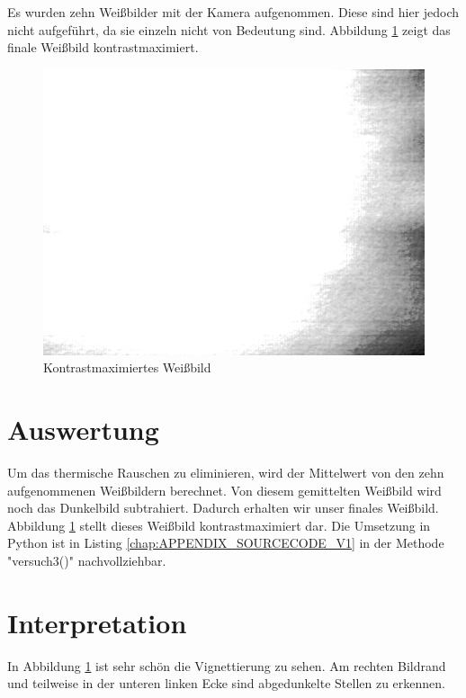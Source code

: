 \documentclass[12pt,oneside,a4paper]{report}
\begin{document}
Es wurden zehn Weißbilder mit der Kamera aufgenommen. Diese sind hier jedoch nicht aufgeführt, da sie einzeln nicht von Bedeutung sind.
Abbildung \ref{fig:WEISSBILD} zeigt das finale Weißbild kontrastmaximiert.
 
\begin{figure}
\centering\small
\includegraphics[scale=0.6]{src/WeissbildContrastMax.png}
\caption{Kontrastmaximiertes Weißbild}
\label{fig:WEISSBILD}
\end{figure}

\section{Auswertung}
\label{chap:VERSUCH_3_AUSWERTUNG}

Um das thermische Rauschen zu eliminieren, wird der Mittelwert von den zehn aufgenommenen Weißbildern berechnet. Von diesem gemittelten Weißbild wird noch das Dunkelbild subtrahiert.
Dadurch erhalten wir unser finales Weißbild. Abbildung \ref{fig:WEISSBILD} stellt dieses Weißbild kontrastmaximiert dar. Die Umsetzung in Python ist in Listing \ref{chap:APPENDIX_SOURCECODE_V1} in der Methode "versuch3()"  nachvollziehbar.

\section{Interpretation}
\label{chap:VERSUCH_3_INTERPRETATION}

In Abbildung \ref{fig:WEISSBILD} ist sehr schön die Vignettierung zu sehen. Am rechten Bildrand und teilweise in der unteren linken Ecke sind abgedunkelte Stellen zu erkennen.
%
%
\end{document}
